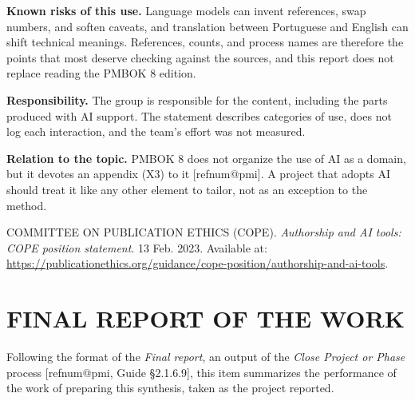 \documentclass[12pt,a4paper,article,oneside,brazil,english]{abntex2}
\makeatletter
\newcommand{\refnum}[1]{\csname refnum@#1\endcsname}
\newcommand{\cit}[1]{[\refnum{#1}]}
\makeatother
\begin{document}
\textbf{Known risks of this use.} Language models can invent references, swap numbers, and soften caveats, and translation between Portuguese and English can shift technical meanings. References, counts, and process names are therefore the points that most deserve checking against the sources, and this report does not replace reading the PMBOK 8 edition.

\textbf{Responsibility.} The group is responsible for the content, including the parts produced with AI support. The statement describes categories of use, does not log each interaction, and the team's effort was not measured.

\textbf{Relation to the topic.} PMBOK 8 does not organize the use of AI as a domain, but it devotes an appendix (X3) to it \cit{pmi}. A project that adopts AI should treat it like any other element to tailor, not as an exception to the method.

\begingroup\small\noindent COMMITTEE ON PUBLICATION ETHICS (COPE). \textit{Authorship and AI tools: COPE position statement}. 13 Feb. 2023. Available at: \url{https://publicationethics.org/guidance/cope-position/authorship-and-ai-tools}.\par\endgroup
\fi

\section{FINAL REPORT OF THE WORK}

Following the format of the \textit{Final report}, an output of the \textit{Close Project or Phase} process [\refnum{pmi}, Guide §2.1.6.9], this item summarizes the performance of the work of preparing this synthesis, taken as the project reported.
\end{document}
